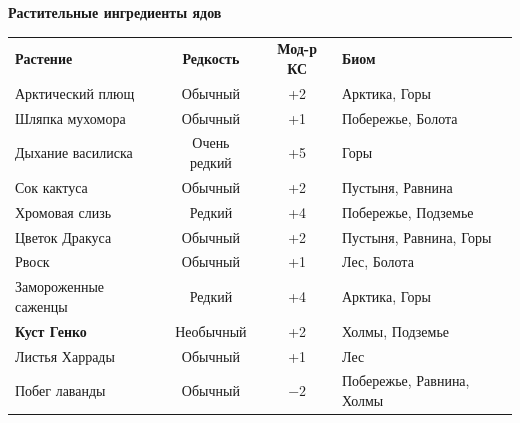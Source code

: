 \documentclass[a4paper, 9pt, twocolumn]{book}
\begin{document}
	\begin{table}[H]
		
		{\Large \textbf{Растительные ингредиенты ядов}}
		
		\centering
		
		\medspace
		
		\begin{tabularx}{\linewidth}{X C c X}
			
			\textbf{Растение} & \textbf{Редкость} & \textbf{Мод-р КС} & \textbf{Биом} \\
			
			Арктический плющ & Обычный & +2 & Арктика, Горы \\
			
			Шляпка мухомора & Обычный & +1 & Побережье, Болота \\
			
			Дыхание василиска & Очень редкий & +5 & Горы \\
			
			Сок кактуса & Обычный & +2 & Пустыня, Равнина \\
			
			Хромовая слизь & Редкий & +4 & Побережье, Подземье \\
			
			Цветок Дракуса & Обычный & +2 & Пустыня, Равнина, Горы \\
			
			Рвоск & Обычный & +1 & Лес, Болота \\
			
			Замороженные саженцы & Редкий & +4 & Арктика, Горы \\
			
			\textbf{Куст Генко} & Необычный & +2 & Холмы, Подземье \\
			
			Листья Харрады & Обычный & +1 & Лес \\
			
			Побег лаванды & Обычный & $-2$ & Побережье, Равнина, Холмы \\
			

\end{tabularx}
\end{table}
\end{document}
